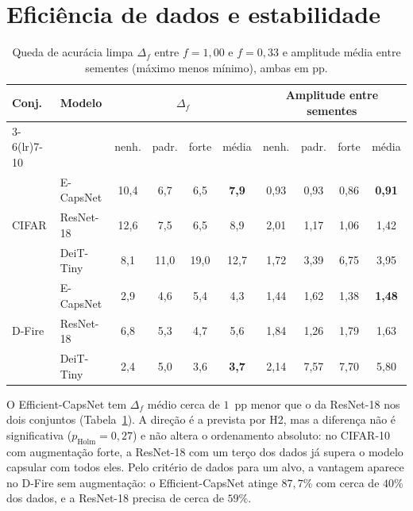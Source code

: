 \section{Eficiência de dados e estabilidade}
\label{sec:res:data}
\label{sec:res:seeds}

\begin{table}[htb]
  \centering
  \caption{Queda de acurácia limpa $\Delta_f$ entre $f = 1{,}00$ e $f = 0{,}33$
  e amplitude média entre sementes (máximo menos mínimo), ambas em pp.}
  \label{tab:res-dataeff}
  \footnotesize
  \begin{tabular}{llcccc@{\hspace{14pt}}cccc}
    \toprule
    \multirow{2}{*}{Conj.} & \multirow{2}{*}{Modelo}
      & \multicolumn{4}{c}{$\Delta_f$} & \multicolumn{4}{c}{Amplitude entre sementes} \\
    \cmidrule(lr){3-6}\cmidrule(lr){7-10}
     & & nenh. & padr. & forte & média & nenh. & padr. & forte & média \\
    \midrule
    \multirow{3}{*}{CIFAR}
      & E-CapsNet & 10,4 & 6,7  & 6,5  & \textbf{7,9} & 0,93 & 0,93 & 0,86 & \textbf{0,91} \\
      & ResNet-18 & 12,6 & 7,5  & 6,5  & 8,9          & 2,01 & 1,17 & 1,06 & 1,42 \\
      & DeiT-Tiny & 8,1  & 11,0 & 19,0 & 12,7         & 1,72 & 3,39 & 6,75 & 3,95 \\
    \midrule
    \multirow{3}{*}{D-Fire}
      & E-CapsNet & 2,9  & 4,6  & 5,4  & 4,3          & 1,44 & 1,62 & 1,38 & \textbf{1,48} \\
      & ResNet-18 & 6,8  & 5,3  & 4,7  & 5,6          & 1,84 & 1,26 & 1,79 & 1,63 \\
      & DeiT-Tiny & 2,4  & 5,0  & 3,6  & \textbf{3,7} & 2,14 & 7,57 & 7,70 & 5,80 \\
    \bottomrule
  \end{tabular}
\end{table}

O Efficient-CapsNet tem $\Delta_f$ médio cerca de $1$~pp menor que o da
ResNet-18 nos dois conjuntos (Tabela~\ref{tab:res-dataeff}). A direção é a
prevista por H2, mas a diferença não é significativa ($p_{\text{Holm}} = 0{,}27$)
e não altera o ordenamento absoluto: no CIFAR-10 com augmentação forte, a
ResNet-18 com um terço dos dados já supera o modelo capsular com todos eles. Pelo
critério de dados para um alvo, a vantagem aparece no D-Fire sem augmentação: o
Efficient-CapsNet atinge $87{,}7\%$ com cerca de $40\%$ dos dados, e a ResNet-18
precisa de cerca de $59\%$.

